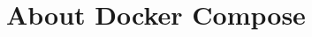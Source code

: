 \documentclass[presentation]{beamer}\mode<presentation>{\usetheme{AMSBolognaFC}}
\begin{document}
%
%
%
%
%

\section{About Docker Compose}
\end{document}
